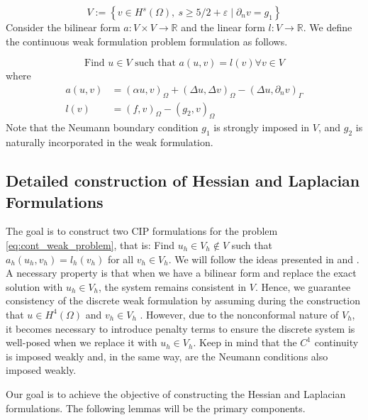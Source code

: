 \documentclass[11pt]{article}
\theoremstyle{remark}
\renewcommand{\ge}{\geqslant}
\numberwithin{equation}{section}
\begin{document}
\begin{equation}
\label{eq:V_deg}
V := \left\{ v \in  H^s( \Omega ), \  s \ge  5  /2 + \varepsilon   \mid \partial _{n} v  = g_{1}     \right\}
\end{equation}
Consider the bilinear form $a:V\times V \to \mathbb{R}$ and the linear form $l: V \to \mathbb{R}$. We define the continuous weak formulation problem formulation as follows.


\begin{equation}
\label{eq:cont_weak_problem}
\text{Find } u \in V   \text{ such that } a( u,v) = l( v)  \forall v \in V
\end{equation}
where
\begin{equation}
    \begin{split}
a( u,v) & =  ( \alpha u,v)_{\Omega } + ( \Delta u, \Delta v)_{\Omega } - (  \Delta u, \partial _{n} v) _{\Gamma }\\
l( v)  &= ( f,v)_{\Omega } - ( g_{2} , v)_\Omega
    \end{split}
\end{equation}
Note that the Neumann boundary condition $g_{1}$ is strongly imposed in $V$, and $g_{2}$ is naturally incorporated in the weak formulation.


\subsection{Detailed construction of Hessian and Laplacian Formulations }%
\label{sub:construction_of_laplacian_cip}
The goal is to construct two CIP formulations for the problem \eqref{eq:cont_weak_problem}, that is: Find $u_{h} \in V_{h} \not\in V$ such that $a_{h}( u_{h}, v_{h}) = l_{h}( v_{h}) $ for all $v_{h} \in V_{h}$. We will follow the ideas presented in \cite{brenner2012} and \cite{feng2007fully}.
A necessary property is that when we have a bilinear form and replace the exact solution with $u_{h} \in V_{h}$, the system remains consistent in $V$.
Hence, we guarantee consistency of the discrete weak formulation by assuming during
the construction that $u \in H^{4}( \Omega ) $ and $v_{h} \in  V_{h}$ .
 However, due to the nonconformal nature of $V_{h}$, it becomes necessary to introduce penalty terms to ensure the discrete system is well-posed when we replace it with $u_{h} \in V_{h}$. Keep in mind that the $C^{1}$
continuity is imposed weakly and, in the same way, are the Neumann conditions also imposed weakly.

Our goal is to achieve the objective of constructing the Hessian and Laplacian formulations. The following lemmas will be the primary components.
\end{document}
